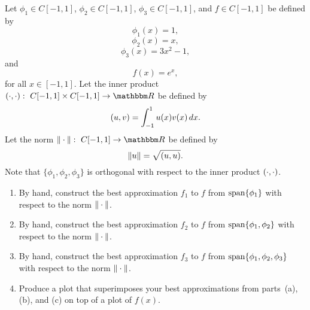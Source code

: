 
Let $\phi_1\in C[-1,1]$, $\phi_2\in C[-1,1]$, $\phi_3\in C[-1,1]$, and $f\in C[-1,1]$ be defined by
\[
\phi_1(x) = 1,
\]
\[
\phi_2(x) = x,
\]
\[
\phi_3(x) = 3x^2-1,
\]
and
\[
f(x) = e^x,
\]
for all $x\in[-1,1]$. Let the inner product $\ip{\cdot,\cdot}:\mbox{ }C[-1,1]\times C[-1,1]\rightarrow\R$ be defined by
\[
(u,v) = \int_{-1}^1 u(x)v(x)\, dx.
\]
Let the norm $\norm{\cdot}:\mbox{ }C[-1,1]\rightarrow\R$ be defined by
\[
\|u\| = \sqrt{(u,u)}.
\]
Note that $\{\phi_1,\phi_2,\phi_3\}$ is orthogonal with respect to the inner product $(\cdot,\cdot)$.
\\
\begin{enumerate}
\item By hand, construct the best approximation $f_1$ to $f$ from ${\rm span}\{\phi_1\}$ with respect to the norm $\|\cdot\|$.
\\
\item By hand, construct the best approximation $f_2$ to $f$ from ${\rm span}\{\phi_1,\phi_2\}$ with respect to the norm $\|\cdot\|$.
\\
\item By hand, construct the best approximation $f_3$ to $f$ from ${\rm span}\{\phi_1,\phi_2,\phi_3\}$ with respect to the norm $\|\cdot\|$.
\\
\item  Produce a plot that superimposes your best approximations from parts~(a), (b), and (c) on top of a plot of $f(x)$.
\end{enumerate}




